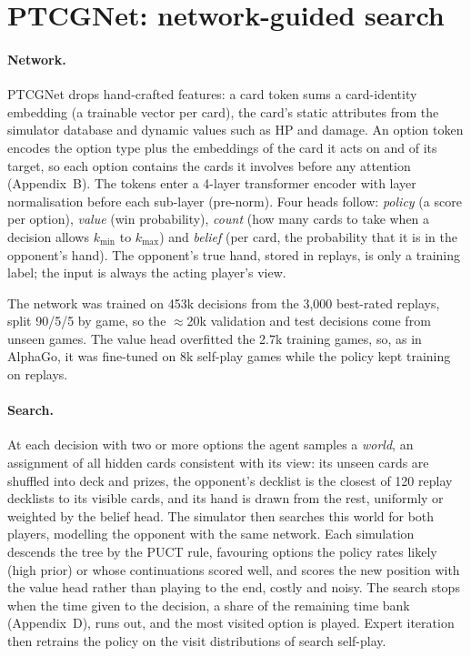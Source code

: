 \documentclass{article}
\begin{document}
\section{PTCGNet: network-guided search}\label{sec:gen2}
\paragraph*{Network.} PTCGNet drops hand-crafted features: a card token sums a card-identity embedding (a trainable vector per card), the card's static attributes from the simulator database and dynamic values such as HP and damage. An option token encodes the option type plus the embeddings of the card it acts on and of its target, so each option contains the cards it involves before any attention (Appendix~B). The tokens enter a 4-layer transformer encoder with layer normalisation before each sub-layer (pre-norm). Four heads follow: \emph{policy} (a score per option), \emph{value} (win probability), \emph{count} (how many cards to take when a decision allows $k_{\min}$ to $k_{\max}$) and \emph{belief} (per card, the probability that it is in the opponent's hand). The opponent's true hand, stored in replays, is only a training label; the input is always the acting player's view.

The network was trained on 453k decisions from the 3{,}000 best-rated replays, split 90/5/5 by game, so the $\approx$20k validation and test decisions come from unseen games. The value head overfitted the 2.7k training games, so, as in AlphaGo, it was fine-tuned on 8k self-play games while the policy kept training on replays.

\paragraph*{Search.} At each decision with two or more options the agent samples a \emph{world}, an assignment of all hidden cards consistent with its view: its unseen cards are shuffled into deck and prizes, the opponent's decklist is the closest of 120 replay decklists to its visible cards, and its hand is drawn from the rest, uniformly or weighted by the belief head. The simulator then searches this world for both players, modelling the opponent with the same network. Each simulation descends the tree by the PUCT rule, favouring options the policy rates likely (high prior) or whose continuations scored well, and scores the new position with the value head rather than playing to the end, costly and noisy. The search stops when the time given to the decision, a share of the remaining time bank (Appendix~D), runs out, and the most visited option is played. Expert iteration then retrains the policy on the visit distributions of search self-play.
\end{document}
